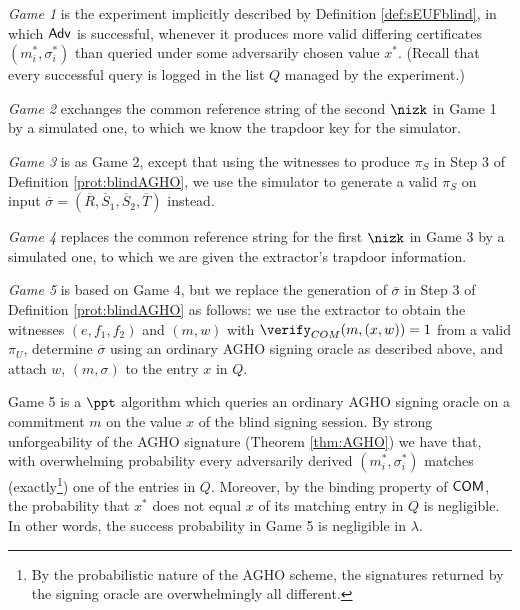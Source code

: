 \begin{description}
\item
\emph{Game 1} is the experiment implicitly described by Definition \ref{def:sEUFblind}, 
in which $\mathsf{Adv}$ is successful, whenever it produces more valid differing certificates $(m_i^*,\sigma_i^*)$  than queried under some adversarily chosen value $x^*$. 
(Recall that every successful query is logged in the list $Q$ managed by the experiment.)
 
\item
\emph{Game 2} exchanges the common reference string of the second $\nizk$ in Game 1 by a simulated one, to which we know the  trapdoor key for the simulator.

\item
\emph{Game 3} is as Game 2, except that using the witnesses to produce $\pi_S$ in Step 3 of Definition \ref{prot:blindAGHO}, we use the simulator to generate a valid $\pi_S$ on input $\overline\sigma= (\overline R, \overline S_1, \overline S_2, \overline T)$ instead.

 \item
\emph{Game 4} replaces the common reference string for the first $\nizk$ in Game 3 by a simulated one, to which we are given the extractor's trapdoor information.

\item
\emph{Game 5} is based on Game 4, but 
we replace the generation of $\overline\sigma$ in Step 3 of Definition \ref{prot:blindAGHO} as follows:
we use the extractor  to obtain the witnesses $(e,f_1,f_2)$ and $(m,w)$ with $\verify_{COM}(m,(x,w))=1$ from a valid $\pi_U$, determine $\overline\sigma$ using an ordinary AGHO signing oracle as described above, and attach $w$, $(m,\sigma)$ to the entry $x$ in $Q$. 
\end{description}

Game 5 is a $\ppt$ algorithm which queries an ordinary AGHO signing oracle on a commitment $m$ on the value $x$ of the blind signing session.
By strong unforgeability of the AGHO signature (Theorem \ref{thm:AGHO}) we have that, with overwhelming probability every adversarily derived $(m_i^*,\sigma_i^*)$ matches (exactly\footnote{By the probabilistic nature of the AGHO scheme, the signatures returned by the signing oracle are overwhelmingly all different.}) one of the entries in $Q$.
Moreover, by the binding property of $\operatorname{\mathsf{COM}}$, the probability that $x^*$ does not equal $x$ of its matching entry in $Q$ is negligible.
In other words, the success probability in Game 5 is negligible in $\lambda$.

